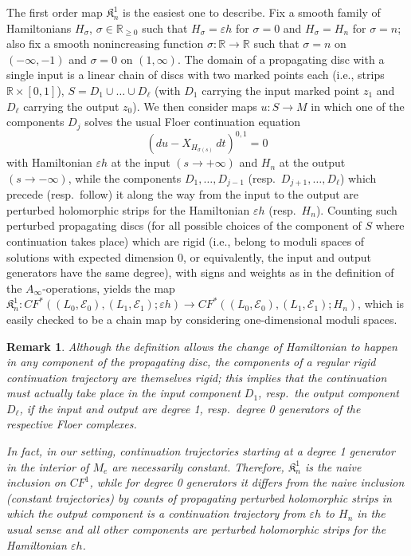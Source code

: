 \documentclass[11pt,leqno]{amsart}
\newtheorem{remark}[theo]{Remark}
\numberwithin{equation}{section}
\def\R{\mathbb{R}}
\newcommand{\cE}{{\mathcal E}}
\begin{document}
The first order map $\mathfrak{K}_n^1$
is the easiest one to describe. Fix a smooth family of Hamiltonians
$H_\sigma$, $\sigma\in \R_{\geq 0}$ such that $H_\sigma=\varepsilon h$ for
$\sigma=0$ and $H_\sigma=H_n$ for $\sigma=n$; also fix a smooth
nonincreasing function $\sigma:\R\to \R$ such that $\sigma=n$ on
$(-\infty,-1)$ and $\sigma=0$ on $(1,\infty)$. The domain of a propagating disc
with a single input is a linear chain of discs with two marked points each
(i.e., strips $\R\times [0,1]$), $S=D_1\cup\dots\cup D_\ell$ (with $D_1$ carrying the input marked point
$z_1$ and $D_\ell$ carrying the output $z_0$). We then consider maps $u:S\to M$ in
which one of the components $D_j$ solves the usual Floer continuation equation
$$(du-X_{H_{\sigma(s)}}\,dt)^{0,1}=0$$
with Hamiltonian $\varepsilon h$ at the input $(s\to +\infty)$ and $H_n$ at
the output $(s\to -\infty)$, while the components $D_1,\dots,D_{j-1}$ 
(resp.\ $D_{j+1},\dots,D_\ell$) which precede (resp.\ follow) it along the
way from the input to the output are perturbed holomorphic strips for the Hamiltonian
$\varepsilon h$ (resp.\ $H_n$). Counting such perturbed propagating discs
(for all possible choices of the component of $S$ where continuation takes
place) which are rigid  (i.e., belong to moduli spaces of solutions with expected dimension 0, or
equivalently, the input and output generators have the same degree), with
signs and weights as in the definition of the $A_\infty$-operations,
yields the map $\mathfrak{K}_n^1:CF^*((L_0,\cE_0),(L_1,\cE_1);\varepsilon h)\to
CF^*((L_0,\cE_0),(L_1,\cE_1);H_n)$, which is easily checked to be a chain
map by considering one-dimensional moduli spaces.

\begin{remark}\label{rmk:continuation}
Although the definition allows the change of Hamiltonian
to happen in any component of the propagating disc, the components of a regular 
rigid continuation trajectory are themselves rigid; this implies that the continuation
must actually take place in the input component $D_1$, resp.\ the output
component $D_\ell$, if the input and output 
are degree 1, resp.\ degree 0 generators of the respective Floer complexes.

In fact, in our setting, continuation
trajectories starting at a degree 1 generator in the interior of $M_e$ are
necessarily constant. Therefore, $\mathfrak{K}_n^1$ is the naive inclusion
on $CF^1$, while for degree 0 generators it differs from
the naive inclusion (constant trajectories) by counts of propagating
perturbed holomorphic strips in which the output component is a continuation trajectory
from $\varepsilon h$ to $H_n$ in the usual sense and all other components
are perturbed holomorphic strips for the Hamiltonian $\varepsilon h$.
\end{remark}
\end{document}
